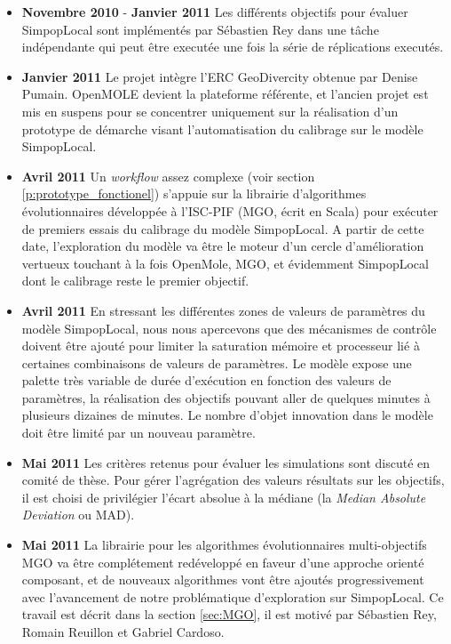 \begin{itemize}[label=\textbullet]
\item {\textbf{Novembre 2010} - \textbf{Janvier 2011} } Les différents objectifs pour évaluer SimpopLocal sont implémentés par Sébastien Rey dans une tâche indépendante qui peut être executée une fois la série de réplications executés. 

\item {\textbf{Janvier 2011}} Le projet intègre l'ERC GeoDivercity obtenue par Denise Pumain. OpenMOLE devient la plateforme référente, et l'ancien projet est mis en suspens pour se concentrer uniquement sur la réalisation d'un prototype de démarche visant l'automatisation du calibrage sur le modèle SimpopLocal.

\item {\textbf{Avril 2011}} Un \textit{workflow} assez complexe (voir section \ref{p:prototype_fonctionel}) s'appuie sur la librairie d'algorithmes évolutionnaires développée à l'ISC-PIF (MGO, écrit en Scala) pour exécuter de premiers essais du calibrage du modèle SimpopLocal. A partir de cette date, l'exploration du modèle va être le moteur d'un cercle d'amélioration vertueux touchant à la fois OpenMole, MGO, et évidemment SimpopLocal dont le calibrage reste le premier objectif. 

\item {\textbf{Avril 2011}} En stressant les différentes zones de valeurs de paramètres du modèle SimpopLocal, nous nous apercevons que des mécanismes de contrôle doivent être ajouté pour limiter la saturation mémoire et processeur lié à certaines combinaisons de valeurs de paramètres. Le modèle expose une palette très variable de durée d'exécution en fonction des valeurs de paramètres, la réalisation des objectifs pouvant aller de quelques minutes à plusieurs dizaines de minutes. Le nombre d'objet innovation dans le modèle doit être limité par un nouveau paramètre. 

\item{\textbf{Mai 2011}} Les critères retenus pour évaluer les simulations sont discuté en comité de thèse. Pour gérer l'agrégation des valeurs résultats sur les objectifs, il est choisi de privilégier l'écart absolue à la médiane (la \textit{Median Absolute Deviation} ou MAD). 

\item {\textbf{Mai 2011}} La librairie pour les algorithmes évolutionnaires multi-objectifs MGO va être complétement redéveloppé en faveur d'une approche orienté composant, et de nouveaux algorithmes vont être ajoutés progressivement avec l'avancement de notre problématique d'exploration sur SimpopLocal. Ce travail est décrit dans la section \ref{sec:MGO}, il est motivé par Sébastien Rey, Romain Reuillon et Gabriel Cardoso. 


\end{itemize}

